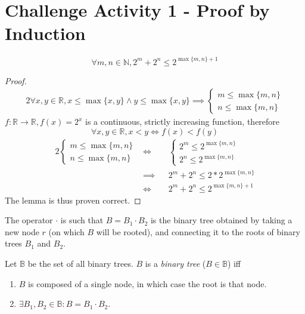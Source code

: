 \setcounter{section}{0}
\section{Challenge Activity 1 - Proof by Induction}
\begin{lemma} \label{lem:CA01_max}
\begin{equation*}
	\forall m,n \in \mathbb{N}, 2^m+2^n \leq 2^{\max \{m,n\} +1}
\end{equation*}
\end{lemma}
\begin{proof}
\begin{alignat*}{2}
	\forall x,y \in \mathbb{R}, x \leq \max \{x,y\} \wedge y \leq \max \{x,y\}
	\implies \begin{cases}
		m \leq \max \{ m,n\}\\
		n \leq \max \{ m,n\}
	\end{cases}
\end{alignat*}
$f \colon \mathbb{R} \rightarrow \mathbb{R}, f(x)=2^x$ is a continuous, strictly increasing function, therefore
\begin{equation*}
	\forall x,y \in \mathbb{R}, x<y \iff f(x) < f(y)
\end{equation*}
\begin{alignat*}{2}
	\begin{cases}
		m \leq \max \{ m,n\}\\
		n \leq \max \{ m,n\}
	\end{cases}
	&\iff &&
	\begin{cases}
		2^m \leq 2^{\max \{ m,n\}}\\
		2^n \leq 2^{\max \{ m,n\}}
	\end{cases}\\
	&\implies && 2^m+2^n \leq 2 * 2^{\max \{m,n\}}\\
	&\iff     && 2^m+2^n \leq 2^{\max \{m,n\} +1}
\end{alignat*}
The lemma is thus proven correct.
\end{proof}
\begin{definition}
	The operator $\cdot$ is such that $B=B_1 \cdot B_2$ is the binary tree obtained by taking a new node $r$ (on which $B$ will be rooted), and connecting it to the roots of binary trees $B_1$ and $B_2$.
\end{definition}
\begin{definition}
Let $\mathbb{B}$ be the set of all binary trees.
$B$ is a \textit{binary tree} ($B \in \mathbb{B}$) iff
\begin{enumerate}
	\item \label{def:BT1} $B$ is composed of a single node, in which case the root is that node.
	\item \label{def:BT2} $\exists B_1,B_2 \in \mathbb{B} \colon B=B_1 \cdot B_2$.
\end{enumerate}
\end{definition}
